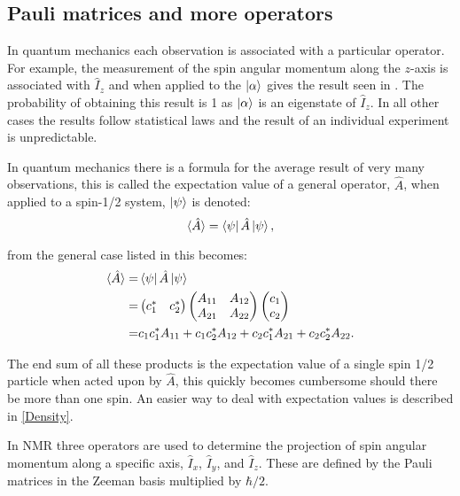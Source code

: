 \subsection{Pauli matrices and more operators}

In quantum mechanics each observation is associated with a particular operator. For
example, the measurement of the spin angular momentum along the $z$-axis is associated with
$\hat{I}_z$ and when applied to the $\ket{\alpha}$ gives the result seen in . The
probability of obtaining this result is 1 as $\ket{\alpha}$ is an eigenstate of $\hat{I}_z$. In
all other cases the results follow statistical laws and the result of an individual experiment
is unpredictable.

In quantum mechanics there is a formula for the average result of very many observations, this is
called the expectation value of a general operator, $\hat{A}$, when applied to a spin-1/2 system, $\ket{\psi}$
is denoted:
\begin{equation}
  \langle\hat{A}\rangle = \bra{\psi}\hat{A}\ket{\psi},
\end{equation}

from the general case listed in  this becomes:
\begin{align}\label{eqn:expectation}
  \langle\hat{A}\rangle =& \bra{\psi}\hat{A}\ket{\psi}\\
  =& \begin{pmatrix}
    c_1^* & c_2^*
\end{pmatrix}
\begin{pmatrix}
A_{11} & A_{12}\\
A_{21} & A_{22}
\end{pmatrix}
\begin{pmatrix}
  c_1\\
  c_2
\end{pmatrix}\\
=& c_1c_1^*A_{11} + c_1c_2^*A_{12} + c_2c_1^*A_{21} + c_2c_2^*A_{22}.
\end{align}

The end sum of all these products is the expectation value of a single spin 1/2 particle when
acted upon by $\hat{A}$, this quickly becomes cumbersome should there be more than one spin. An easier
way to deal with expectation values is described in \ref{Density}.

In NMR three operators are used to determine the projection of spin angular momentum along a
specific axis, $\hat{I}_x$, $\hat{I}_y$, and $\hat{I}_z$. These are defined by the
Pauli matrices in the Zeeman basis multiplied by $\hbar/2$.

